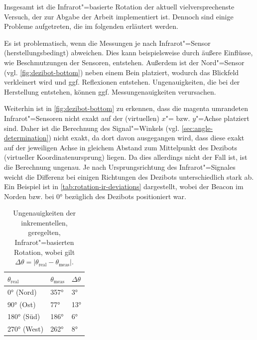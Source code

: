 {Insgesamt ist die Infrarot"=basierte Rotation der aktuell vielversprechenste Versuch, der zur Abgabe der Arbeit implementiert ist.
Dennoch sind einige Probleme aufgetreten, die im folgenden erläutert werden.


Es ist problematisch, wenn die Messungen je nach Infrarot"=Sensor (herstellungsbedingt) abweichen. Dies kann beispielsweise durch äußere Einflüsse, wie Beschmutzungen der Sensoren, entstehen. Außerdem ist der Nord"=Sensor (vgl. \autoref{fig:dezibot-bottom}) neben einem Bein platziert, wodurch das Blickfeld verkleinert wird und ggf. Reflexionen entstehen. Ungenauigkeiten, die bei der Herstellung entstehen, können ggf. Messungenauigkeiten verursachen.


Weiterhin ist in \autoref{fig:dezibot-bottom} zu erkennen, dass die magenta umrandeten Infrarot"=Sensoren nicht exakt auf der (virtuellen) $x$"= bzw. $y$"=Achse platziert sind. Daher ist die Berechnung des Signal"=Winkels (vgl. \autoref{sec:angle-determination}) nicht exakt, da dort davon ausgegangen wird, dass diese exakt auf der jeweiligen Achse in gleichem Abstand zum Mittelpunkt des Dezibots (virtueller Koordinatenursprung) liegen. Da dies allerdings nicht der Fall ist, ist die Berechnung ungenau. Je nach Ursprungsrichtung des Infrarot"=Signales weicht die Differenz bei einigen Richtungen des Dezibots unterschiedlich stark ab. Ein Beispiel ist in \autoref{tab:rotation-ir-deviations} dargestellt, wobei der Beacon im Norden bzw. bei 0° bezüglich des Dezibots positioniert war.

\begin{table}[h]
\centering
\begin{tabular}{l|l|l}
$\theta_{\text{real}}$ & $\theta_{\text{meas}}$ & $\Delta\theta$ \\ \hline\hline
0° (Nord)              & 357°                   & 3°             \\
90° (Ost)              & 77°                    & 13°            \\
180° (Süd)             & 186°                   & 6°             \\
270° (West)            & 262°                   & 8°                     
\end{tabular}
\caption{Ungenauigkeiten der inkrementellen, geregelten, Infrarot"=basierten Rotation, wobei gilt $\Delta\theta = \vert \theta_{\text{real}} - \theta_{\text{meas}} \vert$.}
\label{tab:rotation-ir-deviations}
\end{table}

}
